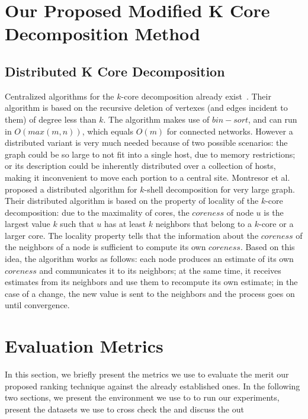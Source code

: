 \documentclass[sigconf]{acmart}
\begin{document}
\section{Our Proposed Modified K Core Decomposition Method}

\subsection{Distributed K Core Decomposition}
\label{distributed k core}
Centralized algorithms for the $k$-core decomposition already exist~\cite{batagelj2011fast}. Their algorithm is based on the recursive deletion of vertexes (and edges incident to them)
of degree less than $k$. The algorithm makes use of $bin-sort$, and can run in $O(max(m,n))$, which equals $O(m)$ for connected networks. However a distributed variant is very much needed because of two possible scenarios: the graph could be so large to not fit into a single host, due to memory restrictions; or its description could be inherently distributed over a collection of hosts, making it inconvenient to move each portion to a central site. Montresor et al.~\cite{montresor2013distributed} proposed a distributed algorithm for $k$-shell decomposition for very large graph. Their distributed algorithm is based on the property of locality of the $k$-core decomposition: due to the maximality of cores, the $coreness$ of node $u$ is the largest value $k$ such that $u$ has at least $k$ neighbors that belong to a $k$-core or a larger core. The locality property tells that the information about the $coreness$ of the neighbors of a node is sufficient to compute its own $coreness$. Based on this idea, the algorithm works as follows: each node produces an estimate of its own $coreness$ and communicates it to its neighbors; at the same time, it receives estimates from its neighbors and use them to recompute its own estimate; in the case of a change, the new value is sent to the neighbors and the process goes on until convergence.



\section{Evaluation Metrics}
\label{evaluation metrics}
In this section, we briefly present the metrics we use to evaluate the merit our proposed ranking technique against the already established ones. In the following two sections, we present the environment we use to to run our experiments, present the datasets we use to cross check the  and discuss the out 
\end{document}
